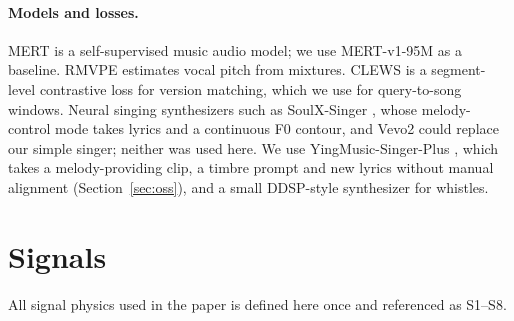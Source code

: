 \documentclass[11pt]{article}
\begin{document}
\paragraph{Models and losses.} MERT \citep{li2024mert} is a self-supervised music audio model; we use MERT-v1-95M as a baseline. RMVPE \citep{wei2023rmvpe} estimates vocal pitch from mixtures. CLEWS \citep{serra2025clews} is a segment-level contrastive loss for version matching, which we use for query-to-song windows. Neural singing synthesizers such as SoulX-Singer \citep{soulxsinger2026}, whose melody-control mode takes lyrics and a continuous F0 contour, and Vevo2 \citep{zhang2025vevo2} could replace our simple singer; neither was used here. We use YingMusic-Singer-Plus \citep{yingmusic2026}, which takes a melody-providing clip, a timbre prompt and new lyrics without manual alignment (Section~\ref{sec:oss}), and a small DDSP-style synthesizer \citep{engel2020ddsp} for whistles.

\section{Signals}\label{sec:signals}

All signal physics used in the paper is defined here once and referenced as S1--S8.
\end{document}
